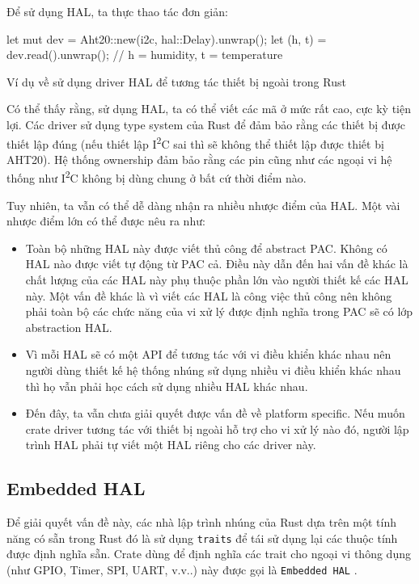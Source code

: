 Để sử dụng HAL, ta thực thao tác đơn giản:

\begin{listing}[ht]
\begin{rustcode}
let mut dev = Aht20::new(i2c, hal::Delay).unwrap();
let (h, t) = dev.read().unwrap(); // h = humidity, t = temperature
\end{rustcode}
\caption{Ví dụ về sử dụng driver HAL để tương tác thiết bị ngoài trong Rust}
\end{listing}

Có thể thấy rằng, sử dụng HAL, ta có thể viết các mã ở mức rất cao, cực kỳ tiện lợi.
Các driver sử dụng type system của Rust để đảm bảo rằng các thiết bị được thiết lập đúng
(nếu thiết lập I\textsuperscript{2}C sai thì sẽ không thể thiết lập được thiết bị AHT20).
Hệ thống ownership đảm bảo rằng các pin cũng như các ngoại vi hệ thống như I\textsuperscript{2}C không bị dùng chung ở bất cứ thời điểm nào.

Tuy nhiên, ta vẫn có thể dễ dàng nhận ra nhiều nhược điểm của HAL.
Một vài nhược điểm lớn có thể được nêu ra như:

\begin{itemize}
    \item Toàn bộ những HAL này được viết thủ công để abstract PAC.
        Không có HAL nào được viết tự động từ PAC cả.
        Điều này dẫn đến hai vấn đề khác là chất lượng của các HAL này phụ thuộc phần lớn vào người thiết kế các HAL này.
        Một vấn đề khác là vì viết các HAL là công việc thủ công nên không phải toàn bộ các chức năng của vi xử lý được định nghĩa trong PAC sẽ có lớp abstraction HAL.
    \item Vì mỗi HAL sẽ có một API để tương tác với vi điều khiển khác nhau nên người dùng thiết kế hệ thống nhúng sử dụng nhiều vi điều khiển khác nhau thì họ vẫn phải học cách sử dụng nhiều HAL khác nhau.
    \item Đến đây, ta vẫn chưa giải quyết được vấn đề về platform specific. Nếu muốn crate driver tương tác với thiết bị ngoài hỗ trợ cho vi xử lý nào đó, người lập trình HAL phải tự viết một HAL riêng cho các driver này. \label{list:hal_prob}
\end{itemize}

\subsection{Embedded HAL}
Để giải quyết vấn đề này, các nhà lập trình nhúng của Rust dựa trên một tính năng có sẵn trong Rust đó là sử dụng \texttt{traits} để tái sử dụng lại các thuộc tính được định nghĩa sẵn.
Crate dùng để định nghĩa các trait cho ngoại vi thông dụng (như GPIO, Timer, SPI, UART, v.v..) này được gọi là \texttt{Embedded HAL} \cite{embedded_hal}.

